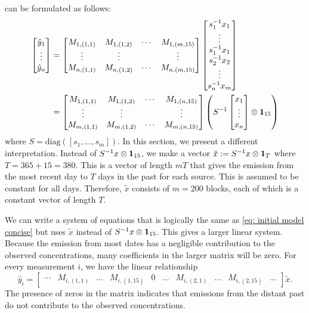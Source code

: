 \documentclass{article}
\begin{document}
 can be formulated as follows:
\begin{align}
    \label{eq: initial model concise} 
\begin{bmatrix}
    \hat{y}_1 \\ 
    \vdots \\
    \hat{y}_{n}
\end{bmatrix}
&=
\begin{bmatrix}
    M_{1,(1,1)} & M_{1,(1,2)} & \cdots & M_{1,(m,15)} \\
    \vdots & \vdots & & \vdots \\
    M_{n,(1,1)} & M_{n,(1,2)} & \cdots & M_{n,(m,15)} \\
\end{bmatrix}
\begin{bmatrix}
    s_1^{-1} x_1\\
    \vdots \\
    s_1^{-1} x_1 \\
    s_2^{-1} x_2 \\
    \vdots \\
    s_n^{-1} x_m
\end{bmatrix} 
\\
&=
\begin{bmatrix}
    M_{1,(1,1)} & M_{1,(1,2)} & \cdots & M_{1,(n,15)} \\
    \vdots & \vdots & & \vdots \\
    M_{m,(1,1)} & M_{m,(1,2)} & \cdots & M_{m,(n,15)} \\
\end{bmatrix}
\left( 
     S^{-1}
     \begin{bmatrix}
        x_1 \\
        \vdots \\
        x_n
     \end{bmatrix}
     \otimes \vb{1}_{15}
\right)
\nonumber
\end{align}
where $S = \mathrm{diag}([s_1,\dots,s_m])$.
In this section, we present a different interpretation. Instead of $S^{-1} x \otimes \vb{1}_{15}$, we make a vector $\tilde{x} := S^{-1} x \otimes \vb{1}_{T}$ where $T = 365 + 15 = 380$. This is a vector of length $mT$ that gives the emission from the most recent day to $T$ days in the past for each source. This is assumed to be constant for all days. Therefore, $\tilde{x}$ consists of $m = 200$ blocks, each of which is a constant vector of length $T$.

We can write a system of equations that is logically the same as \cref{eq: initial model concise} but uses $\tilde{x}$ instead of $S^{-1} x \otimes \vb{1}_{15}$. This gives a larger linear system. Because the emission from most dates has a negligible contribution to the observed concentrations, many coefficients in the larger matrix will be zero. For every measurement $i$, we have the linear relationship
$$
        \hat{y}_i
    =
    \begin{bmatrix}
        \cdots & M_{i,(1,1)} & \dots & M_{i,(1,15)} & 0 & \dots & M_{i,(2,1)} & \dots & M_{i,(2,15)} & \dots
    \end{bmatrix}
    \tilde{x}
.$$
The presence of zeros in the matrix indicates that emissions from the distant past do not contribute to the observed concentrations.
\end{document}

